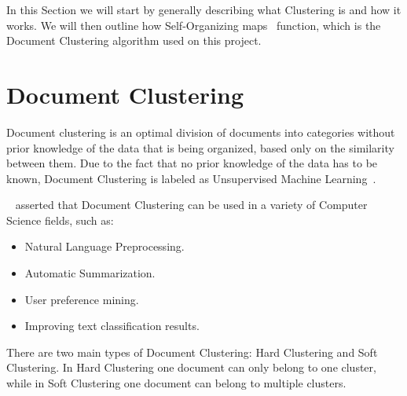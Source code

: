 
In this Section we will start by generally describing what Clustering is and how it works. We will then outline how Self-Organizing maps~\cite{Kohonen1990} function, which is the Document Clustering algorithm used on this project.

\section{Document Clustering}
\label{sec:clustering}
Document clustering is an optimal division of documents into categories without prior knowledge of the data that is being organized, based only on the similarity between them. Due to the fact that no prior knowledge of the data has to be known, Document Clustering is labeled as Unsupervised Machine Learning~\cite{hinton1999unsupervised}.

~\citet{Liu2012b} asserted that Document Clustering can be used in a variety of Computer Science fields, such as:
\begin{itemize}
  \item Natural Language Preprocessing.
  \item Automatic Summarization.
  \item User preference mining.
  \item Improving text classification results.
\end{itemize}

There are two main types of Document Clustering: Hard Clustering and Soft Clustering. In Hard Clustering one document can only belong to one cluster, while in Soft Clustering one document can belong to multiple clusters. 


